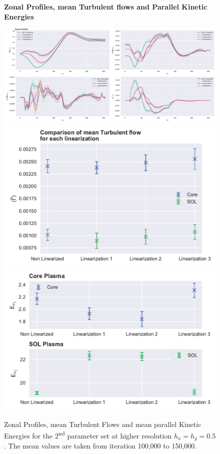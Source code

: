 \documentclass[master.tex]{subfiles}
\begin{document}
\begin{figure}[!hbtp]
    \textbf{Zonal Profiles, mean Turbulent flows and Parallel Kinetic Energies}\par\medskip
    \includegraphics[width=\linewidth]{pdfs/0-2_0-06/zonal_profiles_100000.pdf}
    \includegraphics[width=0.5\linewidth]{pdfs/0-2_0-06/turbulent_flow_means_100000.pdf}
    \includegraphics[width=0.5\linewidth]{pdfs/0-2_0-06/parallel_energies_100000.pdf}
    \caption{Zonal Profiles, mean Turbulent Flows and mean parallel Kinetic Energies for the 2\textsuperscript{nd} parameter set at higher resolution $h_x = h_y = 0.5$. The mean values are taken from iteration 100,000 to 150,000.}
    \label{fig:high-resoultion-set-2}
\end{figure}
\end{document}
